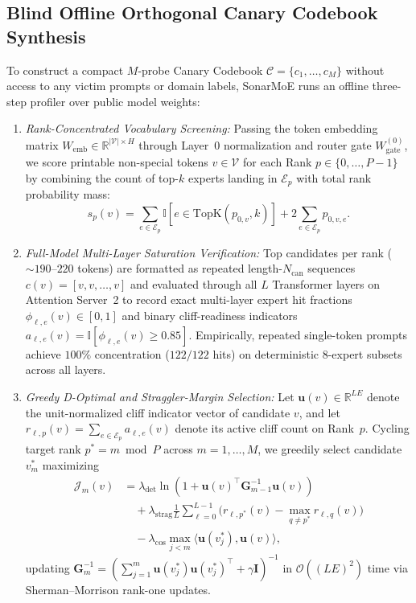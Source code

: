 \documentclass[final,5p,times,twocolumn]{elsarticle}
\def\SM{SonarMoE}%
\theoremstyle{definition}
\theoremstyle{remark}
\newcommand{\SM}{\textsc{SonarMoE}}
\begin{document}
\subsection{Blind Offline Orthogonal Canary Codebook Synthesis}
To construct a compact $M$-probe Canary Codebook $\mathcal{C} = \{c_1, \dots, c_M\}$ without access to any victim prompts or domain labels, \SM{} runs an offline three-step profiler over public model weights:
\begin{enumerate}
  \item \emph{Rank-Concentrated Vocabulary Screening:} Passing the token embedding matrix $W_{\mathrm{emb}} \in \mathbb{R}^{|\mathcal{V}| \times H}$ through Layer~0 normalization and router gate $W_{\mathrm{gate}}^{(0)}$, we score printable non-special tokens $v \in \mathcal{V}$ for each Rank $p \in \{0, \dots, P-1\}$ by combining the count of top-$k$ experts landing in $\mathcal{E}_p$ with total rank probability mass:
  \begin{equation}
    s_p(v) = \sum_{e \in \mathcal{E}_p} \mathbb{I}[e \in \mathrm{TopK}(p_{0, v}, k)] + 2 \sum_{e \in \mathcal{E}_p} p_{0, v, e}.
  \end{equation}
  \item \emph{Full-Model Multi-Layer Saturation Verification:} Top candidates per rank ($\sim 190$--$220$ tokens) are formatted as repeated length-$N_{\mathrm{can}}$ sequences $c(v) = [v, v, \dots, v]$ and evaluated through all $L$ Transformer layers on Attention Server~2 to record exact multi-layer expert hit fractions $\phi_{\ell, e}(v) \in [0, 1]$ and binary cliff-readiness indicators $a_{\ell, e}(v) = \mathbb{I}[\phi_{\ell, e}(v) \ge 0.85]$. Empirically, repeated single-token prompts achieve $100\%$ concentration ($122/122$ hits) on deterministic 8-expert subsets across all layers.
  \item \emph{Greedy D-Optimal and Straggler-Margin Selection:} Let $\mathbf{u}(v) \in \mathbb{R}^{L E}$ denote the unit-normalized cliff indicator vector of candidate $v$, and let $r_{\ell, p}(v) = \sum_{e \in \mathcal{E}_p} a_{\ell, e}(v)$ denote its active cliff count on Rank~$p$. Cycling target rank $p^* = m \bmod P$ across $m = 1, \dots, M$, we greedily select candidate $v_m^*$ maximizing
  \begin{align}\label{eq:d_optimal}
    \mathcal{J}_m(v) &= \lambda_{\mathrm{det}} \ln\!\left(1 + \mathbf{u}(v)^\top \mathbf{G}_{m-1}^{-1} \mathbf{u}(v)\right) \nonumber\\
    &\quad + \lambda_{\mathrm{strag}} \frac{1}{L} \sum_{\ell=0}^{L-1} \Big(r_{\ell, p^*}(v) - \max_{q \neq p^*} r_{\ell, q}(v)\Big) \nonumber\\
    &\quad - \lambda_{\mathrm{cos}} \max_{j < m} \langle \mathbf{u}(v_j^*), \mathbf{u}(v) \rangle,
  \end{align}
  updating $\mathbf{G}_m^{-1} = (\sum_{j=1}^m \mathbf{u}(v_j^*)\mathbf{u}(v_j^*)^\top + \gamma \mathbf{I})^{-1}$ in $\mathcal{O}((LE)^2)$ time via Sherman--Morrison rank-one updates.
\end{enumerate}
\end{document}
